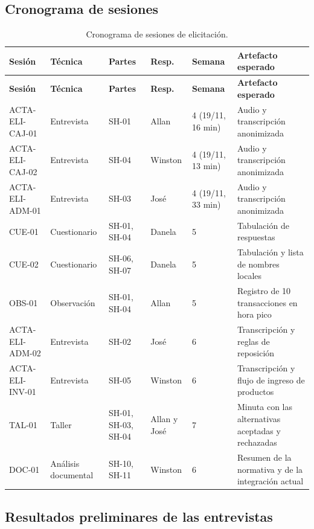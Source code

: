 \subsection{Cronograma de sesiones}

\footnotesize
\begin{longtable}{@{}L{2.6cm}L{2.0cm}L{1.7cm}L{1.6cm}L{1.4cm}L{4.4cm}@{}}
\caption{Cronograma de sesiones de elicitación.}\label{tab:sesiones}\\
\toprule
\textbf{Sesión} & \textbf{Técnica} & \textbf{Partes} & \textbf{Resp.} & \textbf{Semana} & \textbf{Artefacto esperado} \\
\midrule
\endfirsthead
\toprule
\textbf{Sesión} & \textbf{Técnica} & \textbf{Partes} & \textbf{Resp.} & \textbf{Semana} & \textbf{Artefacto esperado} \\
\midrule
\endhead
\bottomrule
\endfoot
ACTA-ELI-CAJ-01 & Entrevista & SH-01 & Allan & 4 (19/11, 16 min) & Audio y transcripción anonimizada \\
ACTA-ELI-CAJ-02 & Entrevista & SH-04 & Winston & 4 (19/11, 13 min) & Audio y transcripción anonimizada \\
ACTA-ELI-ADM-01 & Entrevista & SH-03 & José & 4 (19/11, 33 min) & Audio y transcripción anonimizada \\
CUE-01 & Cuestionario & SH-01, SH-04 & Danela & 5 & Tabulación de respuestas \\
CUE-02 & Cuestionario & SH-06, SH-07 & Danela & 5 & Tabulación y lista de nombres locales \\
OBS-01 & Observación & SH-01, SH-04 & Allan & 5 & Registro de 10 transacciones en hora pico \\
ACTA-ELI-ADM-02 & Entrevista & SH-02 & José & 6 & Transcripción y reglas de reposición \\
ACTA-ELI-INV-01 & Entrevista & SH-05 & Winston & 6 & Transcripción y flujo de ingreso de productos \\
TAL-01 & Taller & SH-01, SH-03, SH-04 & Allan y José & 7 & Minuta con las alternativas aceptadas y rechazadas \\
DOC-01 & Análisis documental & SH-10, SH-11 & Winston & 6 & Resumen de la normativa y de la integración actual \\
\end{longtable}
\normalsize

\subsection{Resultados preliminares de las entrevistas}

